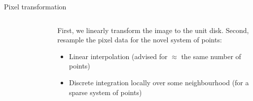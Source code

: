 \documentclass{beamer}
\begin{document}
\begin{frame}{Pixel transformation}
\begin{columns}
\begin{column}{0.5\textwidth}
\begin{figure}
\begin{subfigure}{.48\textwidth}
            \end{subfigure}
        \end{figure}
    \end{column}
    \begin{column}{0.5\textwidth}
        First, we linearly transform the image to the unit disk.
        \vskip 3mm
        Second, resample the pixel data for the novel system of points:
        \begin{itemize}
            \item Linear interpolation (advised for $\approx$ the same number of points)
            \item Discrete integration locally over some neighbourhood (for a sparse system of points)
        \end{itemize}
    \end{column}
\end{columns}

\end{frame}
\end{document}
